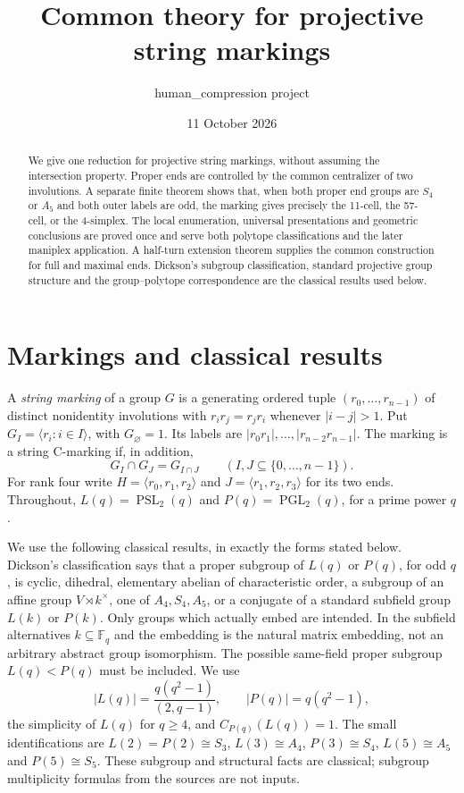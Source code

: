 \documentclass[11pt,a4paper]{article}
\title{Common theory for projective string markings}
\author{human\_compression project}
\date{11 October 2026}
\newcommand{\PSL}{\operatorname{PSL}}
\newcommand{\PGL}{\operatorname{PGL}}
\begin{document}
\maketitle
\begin{abstract}
We give one reduction for projective string markings, without assuming the
intersection property. Proper ends are controlled by the common centralizer
of two involutions. A separate finite theorem shows that, when both proper end groups are
$S_4$ or $A_5$ and both outer labels are odd, the marking gives precisely
the 11-cell, the 57-cell, or the 4-simplex. The local enumeration,
universal presentations and geometric conclusions are proved once and serve
both polytope classifications and the later maniplex application. A half-turn
extension theorem supplies the common construction for full and maximal ends.
Dickson's subgroup classification, standard projective group structure and
the group--polytope correspondence are the classical results used below.
\end{abstract}

\section{Markings and classical results}
A \emph{string marking} of a group $G$ is a generating ordered tuple
$(r_0,\ldots,r_{n-1})$ of distinct nonidentity involutions with
$r_ir_j=r_jr_i$ whenever $|i-j|>1$. Put
$G_I=\langle r_i:i\in I\rangle$, with $G_\varnothing=1$.
Its labels are $|r_0r_1|,\ldots,|r_{n-2}r_{n-1}|$.
The marking is a string C-marking if, in addition,
\begin{equation}\label{eq:ip}
 G_I\cap G_J=G_{I\cap J}\qquad(I,J\subseteq\{0,\ldots,n-1\}).
\end{equation}
For rank four write $H=\langle r_0,r_1,r_2\rangle$ and
$J=\langle r_1,r_2,r_3\rangle$ for its two ends. Throughout,
$L(q)=\PSL_2(q)$ and $P(q)=\PGL_2(q)$, for a prime power $q$.

We use the following classical results, in exactly the forms stated below.
Dickson's classification says that a proper subgroup of $L(q)$ or $P(q)$,
for odd $q$, is cyclic, dihedral, elementary abelian of characteristic order,
a subgroup of an affine group $V\rtimes k^\times$, one of $A_4,S_4,A_5$,
or a conjugate of a standard subfield group $L(k)$ or $P(k)$.
Only groups which actually embed are intended. In the subfield alternatives
$k\subseteq\mathbb F_q$ and the embedding is the natural matrix embedding,
not an arbitrary abstract group isomorphism. The possible same-field proper
subgroup $L(q)<P(q)$ must be included. We use
\[
 |L(q)|=\frac{q(q^2-1)}{(2,q-1)},\qquad |P(q)|=q(q^2-1),
\]
the simplicity of $L(q)$ for $q\ge4$, and $C_{P(q)}(L(q))=1$.
The small identifications are $L(2)=P(2)\cong S_3$, $L(3)\cong A_4$,
$P(3)\cong S_4$, $L(5)\cong A_5$ and $P(5)\cong S_5$.
These subgroup and structural facts are classical; subgroup multiplicity
formulas from the sources are not inputs.
\end{document}
